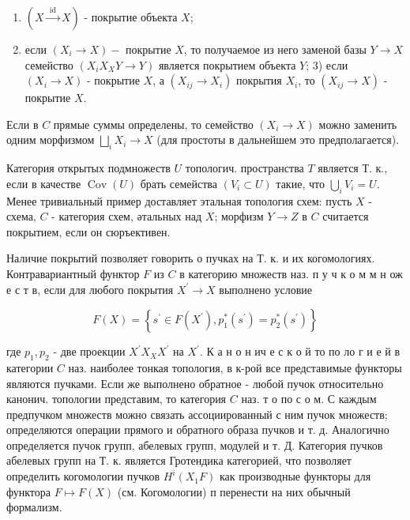 \documentclass[10pt]{article}
\begin{document}
\begin{enumerate}

  \item $(X \stackrel{\text { id }}{\rightarrow} X)$ - покрытие объекта $X$;



  \item если $\left(X_{i} \rightarrow X\right)-$ покрытие $X$, то получаемое из него заменой базы $Y \rightarrow X$ семейство $\left(X_{i} X_{X} Y \rightarrow Y\right)$ является покрытием объекта $Y$; 3) если $\left(X_{i} \rightarrow X\right)$ - покрытие $X$, а $\left(X_{i j} \rightarrow X_{i}\right)$ покрытия $X_{i}$, то $\left(X_{i j} \rightarrow X\right)$ - покрытие $X$.



\end{enumerate}



Если в $C$ прямые суммы определены, то семейство $\left(X_{i} \rightarrow X\right)$ можно заменить одним морфизмом $\bigsqcup_{i} X_{i} \rightarrow X$ (для простоты в дальнейшем это предполагается).



Категория открытых подмножеств $U$ топологич. пространства $T$ является Т. к., если в качестве $\operatorname{Cov}(U)$ брать семейства $\left(V_{i} \subset U\right)$ такие, что $\bigcup_{i} V_{i}=U$. Менее тривиальный пример доставляет этальная топология схем: пусть $X$ - схема, $C$ - категория схем, әтальных над $X$; морфизм $Y \rightarrow Z$ в $C$ считается покрытием, если он сюръективен.



Наличие покрытий позволяет говорить о пучках на Т. к. и их когомологиях. Контравариантный функтор $F$ из $C$ в категорию множеств наз. п у ч к о м м н ож е с т в, если для любого покрытия $X^{\prime} \rightarrow X$ выполнено условие



\[

F(X)=\left\{s^{\prime} \in F\left(X^{\prime}\right), p_{1}^{*}\left(s^{\prime}\right)=p_{2}^{*}\left(s^{\prime}\right)\right\}

\]



где $p_{1}, p_{2}$ - две проекции $X^{\prime} X_{X} X^{\prime}$ на $X^{\prime}$. К а н о н ич е с к о й то по ло г и е й в категории $C$ наз. наиболее тонкая топология, в к-рой все представимые функторы являются пучками. Если же выполнено обратное - любой пучок относительно канонич. топологии представим, то категория $C$ наз. т о по с о м. С каждым предпучком множеств можно связать ассоциированный с ним пучок множеств; определяются операции прямого и обратного образа пучков и т. д. Аналогично определяется пучок групп, абелевых групп, модулей и т. Д. Категория пучков абелевых групп на Т. к. является Гротендика категорией, что позволяет определить когомологии пучков $H^{i}\left(X_{1} F\right)$ как производные функторы для функтора $F \mapsto F(X)$ (см. Когомологии) п перенести на них обычный формализм.
\end{document}
